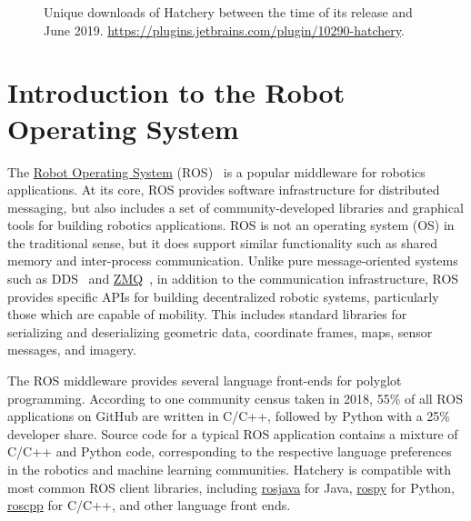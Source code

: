 \documentclass[12pt,initial,twoside,maitrise]{dms}
\numberwithin{equation}{section}
\numberwithin{table}{chapter}
\numberwithin{figure}{chapter}
\begin{document}
\begin{figure}
\centering
{}
\caption{Unique downloads of Hatchery between the time of its release and June 2019. \url{https://plugins.jetbrains.com/plugin/10290-hatchery}.}
\label{fig:hatchery_downloads}
\end{figure}
%
\section{Introduction to the Robot Operating System}

The \href{https://www.ros.org/}{Robot Operating System} (ROS)~\citep{quigley2009ros} is a popular middleware for robotics applications. At its core, ROS provides software infrastructure for distributed messaging, but also includes a set of community-developed libraries and graphical tools for building robotics applications. ROS is not an operating system (OS) in the traditional sense, but it does support similar functionality such as shared memory and inter-process communication. Unlike pure message-oriented systems such as DDS~\citep{pardo2003omg} and \href{https://zeromq.org/}{ZMQ}~\citep{hintjens2013zeromq}, in addition to the communication infrastructure, ROS provides specific APIs for building decentralized robotic systems, particularly those which are capable of mobility. This includes standard libraries for serializing and deserializing geometric data, coordinate frames, maps, sensor messages, and imagery.

The ROS middleware provides several language front-ends for polyglot programming. According to one community census taken in 2018, 55\% of all ROS applications on GitHub are written in C/C++, followed by Python with a 25\%~\citep{Areserio54:online} developer share. Source code for a typical ROS application contains a mixture of C/C++ and Python code, corresponding to the respective language preferences in the robotics and machine learning communities. Hatchery is compatible with most common ROS client libraries, including \href{https://wiki.ros.org/rosjava}{rosjava} for Java, \href{https://wiki.ros.org/rospy}{rospy} for Python, \href{https://wiki.ros.org/rospy}{roscpp} for C/C++, and other language front ends.
\end{document}
